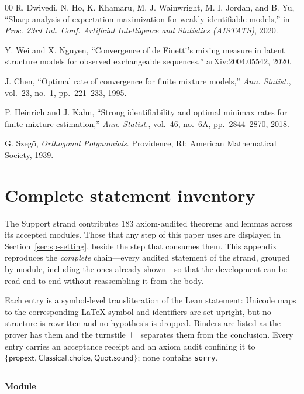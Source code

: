 \begin{thebibliography}{00}
 R. Dwivedi, N. Ho, K. Khamaru, M. J. Wainwright, M. I. Jordan, and
B. Yu, ``Sharp analysis of expectation-maximization for weakly identifiable models,'' in
\emph{Proc. 23rd Int. Conf. Artificial Intelligence and Statistics (AISTATS)}, 2020.

 Y. Wei and X. Nguyen, ``Convergence of de Finetti's mixing measure in
latent structure models for observed exchangeable sequences,'' arXiv:2004.05542, 2020.

 J. Chen, ``Optimal rate of convergence for finite mixture models,''
\emph{Ann. Statist.}, vol.~23, no.~1, pp.~221--233, 1995.

 P. Heinrich and J. Kahn, ``Strong identifiability and optimal minimax
rates for finite mixture estimation,'' \emph{Ann. Statist.}, vol.~46, no.~6A,
pp.~2844--2870, 2018.

 G. Szeg\H{o}, \emph{Orthogonal Polynomials}. Providence, RI: American
Mathematical Society, 1939.

\end{thebibliography}

\appendices
\section{Complete statement inventory}
\label{app:sp-inventory}

The Support strand contributes $183$ axiom-audited theorems and lemmas across its accepted modules. Those that any step of this paper uses are displayed in Section~\ref{sec:sp-setting}, beside the step that consumes them. This appendix reproduces the \emph{complete} chain---every audited statement of the strand, grouped by module, including the ones already shown---so that the development can be read end to end without reassembling it from the body.

Each entry is a symbol-level transliteration of the Lean statement: Unicode maps to the corresponding \LaTeX{} symbol and identifiers are set upright, but no structure is rewritten and no hypothesis is dropped. Binders are listed as the prover has them and the turnstile $\vdash$ separates them from the conclusion. Every entry carries an acceptance receipt and an axiom audit confining it to $\{\textsf{propext},\textsf{Classical.choice},\textsf{Quot.sound}\}$; none contains \texttt{sorry}.

\vspace{4pt}\noindent\rule{\columnwidth}{0.4pt}\par\vspace{2pt}
\noindent\textbf{Module }\par\vspace{3pt}

